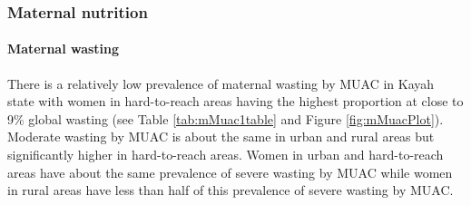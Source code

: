 \documentclass[12pt,a4paper]{article}
\let\oldparagraph\paragraph
\renewcommand{\paragraph}[1]{\oldparagraph{#1}\mbox{}}
\begin{document}
\newpage

\hypertarget{mnutrition}{%
\subsubsection{Maternal nutrition}\label{mnutrition}}

\hypertarget{mwasting}{%
\paragraph{Maternal wasting}\label{mwasting}}

There is a relatively low prevalence of maternal wasting by MUAC in Kayah state with women in hard-to-reach areas having the highest proportion at close to 9\% global wasting (see Table \ref{tab:mMuac1table} and Figure \ref{fig:mMuacPlot}). Moderate wasting by MUAC is about the same in urban and rural areas but significantly higher in hard-to-reach areas. Women in urban and hard-to-reach areas have about the same prevalence of severe wasting by MUAC while women in rural areas have less than half of this prevalence of severe wasting by MUAC.
\end{document}
